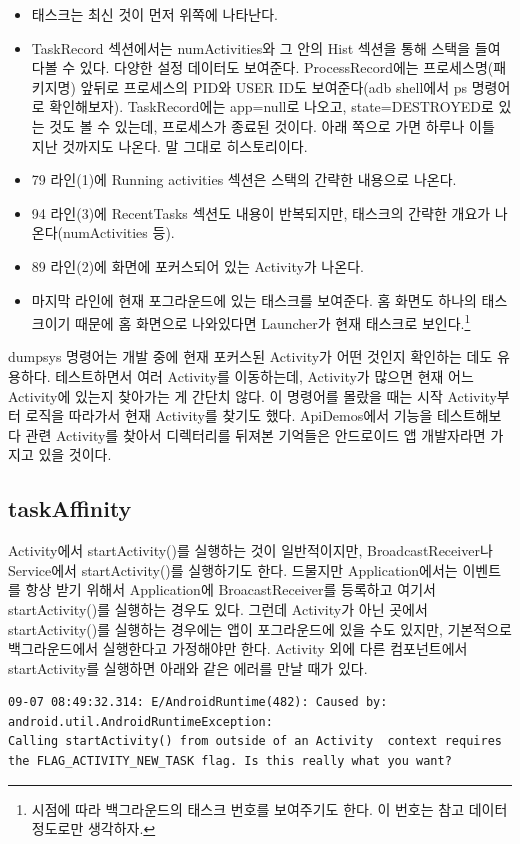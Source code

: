 \begin{itemize}
\item 태스크는 최신 것이 먼저 위쪽에 나타난다.
\item TaskRecord 섹션에서는 numActivities와 그 안의 Hist 섹션을 통해 스택을 들여다볼 수 있다. 다양한 설정 데이터도 보여준다. ProcessRecord에는 프로세스명(패키지명) 앞뒤로 프로세스의 PID와 USER ID도 보여준다(adb shell에서 ps 명령어로 확인해보자).
TaskRecord에는 app=null로 나오고, state=DESTROYED로 있는 것도 볼 수 있는데, 프로세스가 종료된 것이다. 아래 쪽으로 가면 하루나 이틀 지난 것까지도 나온다. 말 그대로 히스토리이다. 
\item 79 라인(1)에 Running activities 섹션은 스택의 간략한 내용으로 나온다.
\item 94 라인(3)에 RecentTasks 섹션도 내용이 반복되지만, 태스크의 간략한 개요가 나온다(numActivities 등).
\item 89 라인(2)에 화면에 포커스되어 있는 Activity가 나온다.
\item 마지막 라인에 현재 포그라운드에 있는 태스크를 보여준다. 홈 화면도 하나의 태스크이기 때문에 홈 화면으로 나와있다면 Launcher가 현재 태스크로 보인다.\footnote{시점에 따라 백그라운드의 태스크 번호를 보여주기도 한다. 이 번호는 참고 데이터 정도로만 생각하자.}
\end{itemize}
dumpsys 명령어는 개발 중에 현재 포커스된 Activity가 어떤 것인지 확인하는 데도 유용하다.
테스트하면서 여러 Activity를 이동하는데, Activity가 많으면 현재 어느 Activity에 있는지 찾아가는 게 간단치 않다.
이 명령어를 몰랐을 때는 시작 Activity부터 로직을 따라가서 현재 Activity를 찾기도 했다. ApiDemos에서 기능을 테스트해보다 관련 Activity를 찾아서 디렉터리를 뒤져본 기억들은 안드로이드 앱 개발자라면 가지고 있을 것이다.

\subsection{taskAffinity}
Activity에서 startActivity()를 실행하는 것이 일반적이지만, BroadcastReceiver나 Service에서 startActivity()를 실행하기도 한다. 드물지만 Application에서는  이벤트를 항상 받기 위해서 Application에 BroacastReceiver를 등록하고 여기서 startActivity()를 실행하는 경우도 있다.
그런데 Activity가 아닌 곳에서 startActivity()를 실행하는 경우에는 앱이 포그라운드에 있을 수도 있지만, 기본적으로 백그라운드에서 실행한다고 가정해야만 한다. Activity 외에 다른 컴포넌트에서 startActivity를 실행하면 아래와 같은 에러를 만날 때가 있다.
\begin{lstlisting}[frame=single]
09-07 08:49:32.314: E/AndroidRuntime(482): Caused by: android.util.AndroidRuntimeException: 
Calling startActivity() from outside of an Activity  context requires 
the FLAG_ACTIVITY_NEW_TASK flag. Is this really what you want?
\end{lstlisting}

